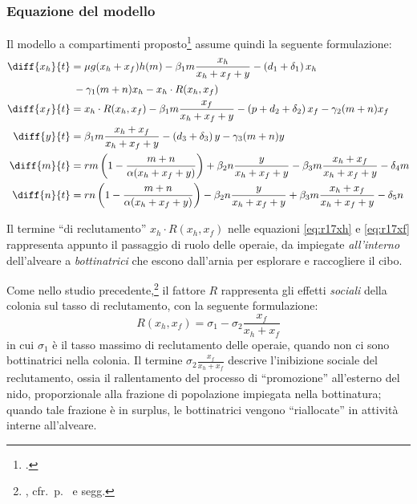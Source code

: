 \subsubsection{Equazione del modello}
Il modello a compartimenti proposto\footcite[8]{ratti2017} assume quindi la seguente formulazione:
\begin{align}
    \diff{x_h}{t} &= \mu g( x_h + x_f ) h(m) - \beta_1 m \frac{x_h}{x_h + x_f + y} - \left( d_1 + \delta_1 \right) x_h \notag \\ %
    \label{eq:r17xh}
        &{\;} - \gamma_1 (m+n) x_h - x_h \cdot R(x_h, x_f) \\ %
    \label{eq:r17xf}
    \diff{x_f}{t} &= x_h \cdot R(x_h, x_f) - \beta_1 m \frac{x_f}{x_h + x_f + y}
    - \left( p + d_2 + \delta_2 \right) x_f - \gamma_2 (m+n) x_f \\
    \label{eq:r17y}
    \diff{y}{t} &= \beta_1 m \frac{x_h + x_f}{x_h + x_f + y} - \left( d_3 + \delta_3 \right) y - \gamma_3 (m+n) y \\
    \label{eq:r17m}
    \diff{m}{t} &= rm \left( 1 - \frac{m+n}{ \alpha (x_h + x_f + y) } \right) + \beta_2 n \frac{y}{x_h + x_f + y}
    - \beta_3 m \frac{x_h + x_f}{x_h + x_f + y} - \delta_4 m \\
    \label{eq:r17n}
    \diff{n}{t} &= rn \left( 1 - \frac{m+n}{ \alpha (x_h + x_f + y) } \right) - \beta_2 n \frac{y}{x_h + x_f + y}
    + \beta_3 m \frac{x_h + x_f}{x_h + x_f + y} - \delta_5 n
\end{align}

Il termine ``di reclutamento'' $x_h \cdot R(x_h, x_f)$ nelle equazioni \eqref{eq:r17xh} e \eqref{eq:r17xf} rappresenta appunto il passaggio di ruolo delle operaie, da impiegate \emph{all'interno} dell'alveare a \emph{bottinatrici} che escono dall'arnia per esplorare e raccogliere il cibo.

Come nello studio precedente,\footnote{\cite{khoury2011}, cfr.~p.~\pageref{eq:Recr} e segg.}
il fattore $R$ rappresenta gli effetti \emph{sociali}
della colonia sul tasso di reclutamento, con la seguente formulazione:
\begin{equation}
    R(x_h, x_f) = \sigma_1 - \sigma_2 \frac{x_f}{x_h + x_f}
\end{equation}
in cui $\sigma_1$ è il tasso massimo di reclutamento delle operaie, quando non ci sono bottinatrici nella colonia.
Il termine $\sigma_2 \frac{x_f}{x_h + x_f}$ descrive l'inibizione sociale del reclutamento, ossia il rallentamento del processo di ``promozione'' all'esterno del nido, proporzionale alla frazione di popolazione impiegata nella bottinatura; quando tale frazione è in surplus, le bottinatrici vengono ``riallocate'' in attività interne all'alveare.

